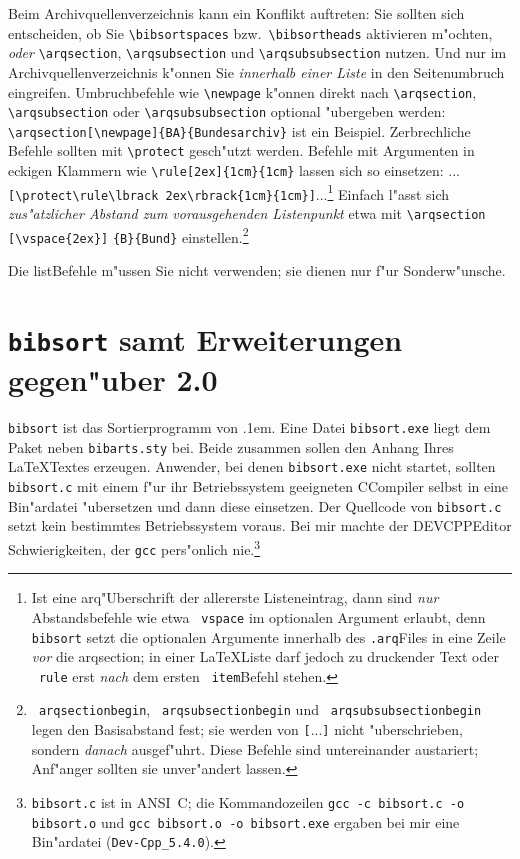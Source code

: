 \documentclass[12pt,a4paper]{article}
\newcommand{\pbs}{\string\ \unskip}
\newcommand{\bs}{\protect\pbs}
\begin{document}
\vspace{1.5ex}\noindent
Beim Archivquellenverzeichnis kann ein Konflikt auftreten:
Sie sollten sich entscheiden, ob Sie \verb|\bibsortspaces| 
bzw.\ \hspace{-.05em}\verb|\bibsortheads| aktivieren
m"ochten, \textit{oder} \verb|\arqsection|,
\verb|\arqsubsection| und \verb|\arqsubsubsection| nutzen.
Und nur im Archivquellenverzeichnis k"onnen Sie \textit{innerhalb 
einer Liste} in den Seitenumbruch eingreifen. Umbruchbefehle
wie \verb|\newpage| k"onnen direkt nach \verb|\arqsection|, 
\verb|\arqsubsection| oder \verb|\arqsubsubsection| optional 
"ubergeben werden:\label{newpage} 
\verb|\arqsection[\newpage]{BA}{Bundesarchiv}| \hspace{.1em}ist ein Beispiel.
Zerbrechliche Befehle sollten mit \verb|\protect| gesch"utzt werden.
Befehle mit Argumenten in eckigen Klammern wie \verb|\rule[2ex]{1cm}{1cm}| lassen
sich so einsetzen: 
...\verb|[\protect\rule\lbrack 2ex\rbrack{1cm}{1cm}]|...\footnote{Ist 
eine arq\hy "Uberschrift der allererste Listeneintrag, dann sind \textit{nur}
Abstandsbefehle wie etwa \texttt{\bs vspace} im optionalen Argument 
erlaubt, denn \texttt{bibsort} setzt die optionalen Argumente innerhalb 
des \texttt{.arq}\hy Files in eine Zeile \textit{vor} die arq\hy section; 
in einer \LaTeX\hy Liste darf jedoch zu druckender Text oder 
\texttt{\bs rule} erst \textit{nach} dem ersten \texttt{\bs item}\hy Befehl stehen.} 
Einfach l"asst sich \textit{zus"atzlicher Abstand zum vorausgehenden 
Listenpunkt} etwa mit \verb|\arqsection| \verb|[\vspace{2ex}]| \verb|{B}{Bund}| 
einstellen.\footnote{\texttt{\bs arqsectionbegin}, 
\texttt{\bs arqsubsectionbegin} und \texttt{\bs arqsubsubsectionbegin} 
legen den Basisabstand fest; sie werden von \texttt{[}...\texttt{]} 
nicht "uberschrieben, sondern \textit{danach} ausgef"uhrt. Diese Befehle sind 
untereinander austariert; Anf"anger sollten sie unver"andert lassen.}  

\vspace{1ex}\vfill\noindent
{\sffamily Die list\hy Befehle m"ussen Sie nicht verwenden; sie dienen nur f"ur Sonderw"unsche.}


\newpage
\section{\texttt{bibsort} samt Erweiterungen gegen"uber 2.0}\label{Sect18}\label{bibsort}

\verb|bibsort| ist das Sortierprogramm von \BibArts\kern.1em. Eine
Datei \verb|bibsort.exe| liegt dem Paket neben \verb|bibarts.sty| bei. 
Beide zusammen sollen den Anhang Ihres \LaTeX\hy Textes erzeugen. 
Anwender, bei denen \verb|bibsort.exe| nicht startet, sollten  
\verb|bibsort.c| mit einem f"ur ihr Betriebssystem
geeigneten C\fhy Compiler selbst in eine Bin"ardatei "ubersetzen und 
dann diese einsetzen. Der Quellcode von \verb|bibsort.c| setzt kein 
bestimmtes Betriebssystem voraus. Bei mir machte der DEVCPP\hy Editor 
Schwierigkeiten, der \verb|gcc| pers"onlich nie.\footnote{\texttt{bibsort.c} ist in 
ANSI~C; die Kommandozeilen \texttt{gcc -c bibsort.c -o bibsort.o}
und \texttt{gcc bibsort.o -o bibsort.exe} ergaben bei mir eine 
Bin"ardatei (\texttt{Dev-Cpp\_5.4.0}).}
\end{document}
